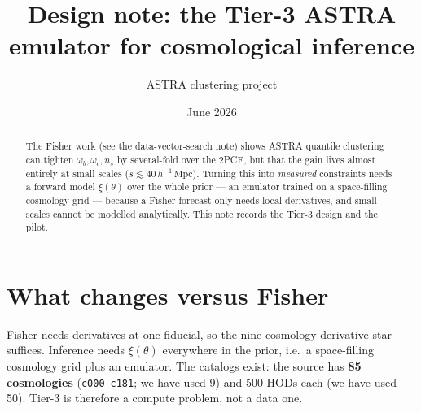 \documentclass[11pt]{article}
\title{Design note: the Tier-3 ASTRA emulator for cosmological inference}
\author{ASTRA clustering project}\date{June 2026}
\newcommand{\Mpch}{\,h^{-1}\,\mathrm{Mpc}}
\newcommand{\code}[1]{\texttt{#1}}
\begin{document}
\maketitle

\begin{abstract}
The Fisher work (see the data-vector-search note) shows ASTRA quantile clustering
can tighten $\omega_b,\omega_c,n_s$ by several-fold over the 2PCF, but that the
gain lives almost entirely at small scales ($s\lesssim40\Mpch$).  Turning this into
\emph{measured} constraints needs a forward model $\xi(\theta)$ over the whole
prior --- an emulator trained on a space-filling cosmology grid --- because a
Fisher forecast only needs local derivatives, and small scales cannot be modelled
analytically.  This note records the Tier-3 design and the pilot.
\end{abstract}

\section{What changes versus Fisher}
Fisher needs derivatives at one fiducial, so the nine-cosmology derivative star
suffices.  Inference needs $\xi(\theta)$ everywhere in the prior, i.e.\ a
space-filling cosmology grid plus an emulator.  The catalogs exist: the source has
\textbf{85 cosmologies} (\code{c000}--\code{c181}; we have used 9) and 500 HODs
each (we have used 50).  Tier-3 is therefore a compute problem, not a data one.
\end{document}
